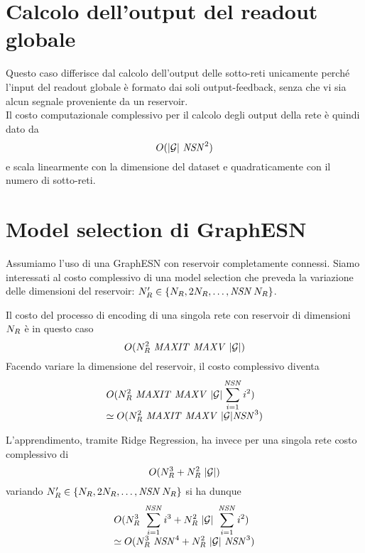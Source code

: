 \section{Calcolo dell'output del readout globale}\label{app:costo:out_globale}
Questo caso differisce dal calcolo dell'output delle sotto-reti unicamente perché l'input del readout globale è formato dai soli output-feedback, senza che vi sia alcun segnale proveniente da un reservoir. \\
Il costo computazionale complessivo per il calcolo degli output della rete è quindi dato da
\begin{equation}
O(\G\ \NSN^2)
\end{equation}
e scala linearmente con la dimensione del dataset e quadraticamente con il numero di sotto-reti.


\section{Model selection di GraphESN}\label{app:costo:modelselection}
Assumiamo l'uso di una GraphESN con reservoir completamente connessi. Siamo interessati al costo complessivo di una model selection che preveda la variazione delle dimensioni del reservoir: $N_R' \in \lbrace N_R, 2N_R, \dots, \mathit{NSN}\, N_R \rbrace$.

Il costo del processo di encoding di una singola rete con reservoir di dimensioni $N_R$ è in questo caso
\begin{equation}
O(N_R^2\ \mathit{MAXIT}\ \mathit{MAXV}\ \lvert\mathcal{G}\rvert)
\end{equation}
Facendo variare la dimensione del reservoir, il costo complessivo diventa
\begin{equation}
\begin{array}{l}
\displaystyle O(N_R^2\ \mathit{MAXIT}\ \mathit{MAXV}\ \lvert\mathcal{G}\rvert \sum_{i=1}^{\mathit{NSN}} i^2) \\
\displaystyle \simeq O(N_R^2\ \mathit{MAXIT}\ \mathit{MAXV}\ \lvert\mathcal{G}\rvert \mathit{NSN}^3)
\end{array}
\end{equation}

L'apprendimento, tramite Ridge Regression, ha invece per una singola rete costo complessivo di
\begin{equation}
O(\Nr^3 + \Nr^2\ \G)
\end{equation}
variando $N_R' \in \lbrace N_R, 2N_R, \dots, \mathit{NSN}\, N_R \rbrace$ si ha dunque
\begin{equation}
\begin{array}{l}
\displaystyle O(\Nr^3\ \sum_{i=1}^{\NSN} i^3 + \Nr^2\ \G\ \sum_{i=1}^{\NSN} i^2) \\
\displaystyle \simeq O(\Nr^3\ \NSN^4 + \Nr^2\ \G\ \NSN^3) \\
\end{array}
\end{equation}

